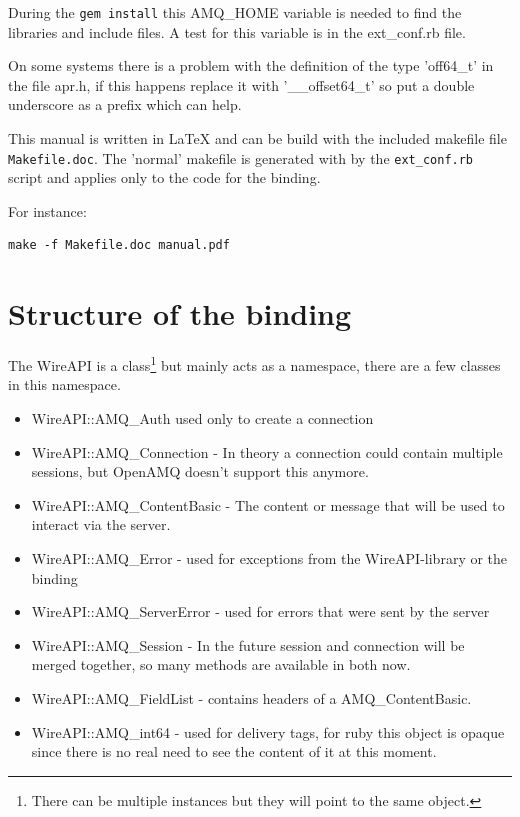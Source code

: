 \documentclass[a4paper,twoside]{article}
\begin{document}
During the {\tt gem install} this AMQ\_HOME variable is needed to
find the libraries and include files. A test for this variable is 
in the ext\_conf.rb file.

On some systems there is a problem with the definition of the
type 'off64\_t' in the file apr.h, if this happens replace it
with '\_\_offset64\_t' so put a double underscore as a prefix
which can help.

This manual is written in \LaTeX { }  and can be build with the
included makefile file {\tt Makefile.doc}. The 'normal' makefile
is generated with by the {\tt ext\_conf.rb} script and applies
only to the code for the binding.

For instance:
\begin{verbatim}
make -f Makefile.doc manual.pdf
\end{verbatim}


\section{Structure of the binding}

The WireAPI is a class\footnote{There can be multiple instances
but they will point to the same object.} but mainly acts as a 
namespace, there are a few classes in this namespace. 

\begin{itemize}
\item WireAPI::AMQ\_Auth used only to create a connection
\item WireAPI::AMQ\_Connection - In theory a connection could
  contain multiple sessions, but OpenAMQ doesn't support this
  anymore.
\item WireAPI::AMQ\_ContentBasic - The content or message that
  will be used to interact via the server.
\item WireAPI::AMQ\_Error - used for exceptions from the 
  WireAPI-library or the binding
\item WireAPI::AMQ\_ServerError - used for errors that were sent
  by the server
\item WireAPI::AMQ\_Session - In the future session and connection 
  will be merged together, so many methods  are available in both now.

\item WireAPI::AMQ\_FieldList - contains headers of a AMQ\_ContentBasic. 
\item WireAPI::AMQ\_int64 - used for delivery tags, for ruby this
  object is opaque since there is no real need to see the content
  of it at this moment.
\end{itemize}
\end{document}
